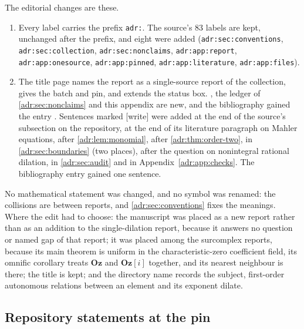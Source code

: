 \documentclass[11pt,letterpaper]{article}
\numberwithin{equation}{section}
\theoremstyle{definition}
\theoremstyle{remark}
\newcommand{\Oz}{\mathbf{Oz}}
\newcommand{\Goz}{\mathbf{Oz}[i]}
\newcommand{\lbl}[1]{\nolinkurl{#1}}%
\newcommand{\wtag}{\textup{[write]}}%
\begin{document}
The editorial changes are these.
\begin{enumerate}[label=(\arabic*)]
\item Every label carries the prefix \texttt{adr:}. The source's 83 labels
are kept, unchanged after the prefix, and eight were added
(\lbl{adr:sec:conventions}, \lbl{adr:sec:collection},
\lbl{adr:sec:nonclaims}, \lbl{adr:app:report},
\lbl{adr:app:onesource}, \lbl{adr:app:pinned},
\lbl{adr:app:literature}, \lbl{adr:app:files}).
\item The title page names the report as a single-source report of the
collection, gives the batch and pin, and extends the status box.
, the ledger of
\cref{adr:sec:nonclaims} and this appendix are new, and the bibliography
gained the entry \cite{Mahler83}. Sentences marked \wtag{} were added at the
end of the source's subsection on the repository, at the end of its
literature paragraph on Mahler equations, after \cref{adr:lem:monomial},
after \cref{adr:thm:order-two}, in \cref{adr:sec:boundaries} (two places),
after the question on nonintegral rational dilation, in
\cref{adr:sec:audit} and in Appendix~\ref{adr:app:checks}. The bibliography entry
\cite{NN} gained one sentence.
\end{enumerate}
No mathematical statement was changed, and no symbol was renamed: the
collisions are between reports, and \cref{adr:sec:conventions} fixes the
meanings. Where the edit had to choose: the manuscript was placed as a new
report rather than as an addition to the single-dilation report, because it
answers no question or named gap of that report; it was placed among the
surcomplex reports, because its main theorem is uniform in the
characteristic-zero coefficient field, its omnific corollary treats $\Oz$
and $\Goz$ together, and its nearest neighbour is there; the title is kept;
and the directory name records the subject, first-order autonomous
relations between an element and its exponent dilate.

\subsection{Repository statements at the pin}\label{adr:app:pinned}
\end{document}
